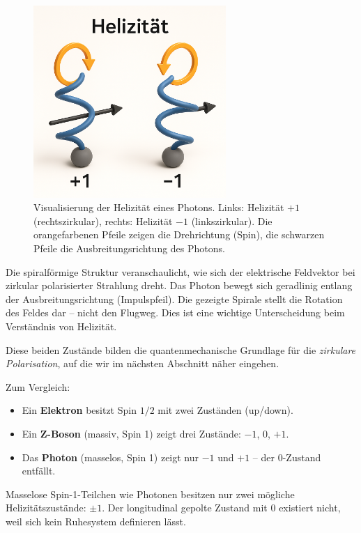 \begin{figure}[H]
	\centering
	\includegraphics[width=0.65\textwidth]{bilder/Helizitaet.png}
	\caption{Visualisierung der Helizität eines Photons. Links: Helizität $+1$ (rechtszirkular), rechts: Helizität $-1$ (linkszirkular). Die orangefarbenen Pfeile zeigen die Drehrichtung (Spin), die schwarzen Pfeile die Ausbreitungsrichtung des Photons.}
	\label{fig:helizitaet}
\end{figure}

\begin{tcolorbox}[physikbox, title=Kommentar zur Darstellung]
	\label{box:Kommentar zur Darstellung}
	Die spiralförmige Struktur veranschaulicht, wie sich der elektrische Feldvektor bei zirkular polarisierter Strahlung dreht. Das Photon bewegt sich geradlinig entlang der Ausbreitungsrichtung (Impulspfeil). Die gezeigte Spirale stellt die Rotation des Feldes dar – nicht den Flugweg. Dies ist eine wichtige Unterscheidung beim Verständnis von Helizität.
\end{tcolorbox}
\vspace{1em}
Diese beiden Zustände bilden die quantenmechanische Grundlage für die \textit{zirkulare Polarisation}, auf die wir im nächsten Abschnitt näher eingehen.

\newpage
\noindent
Zum Vergleich:
\begin{itemize}
	\item Ein \textbf{Elektron} besitzt Spin $1/2$ mit zwei Zuständen (up/down).
	\item Ein \textbf{Z-Boson} (massiv, Spin 1) zeigt drei Zustände: $-1$, $0$, $+1$.
	\item Das \textbf{Photon} (masselos, Spin 1) zeigt nur $-1$ und $+1$ – der $0$-Zustand entfällt.
\end{itemize}
\vspace{1em}
\begin{tcolorbox}[physikbox, title=Didaktischer Merksatz]
	\label{box:didaktischerMerksatz}
	Masselose Spin-1-Teilchen wie Photonen besitzen nur zwei mögliche Helizitätszustände: \textbf{$\pm1$}. Der longitudinal gepolte Zustand mit $0$ existiert nicht, weil sich kein Ruhesystem definieren lässt.
\end{tcolorbox}
\vspace{1em}
